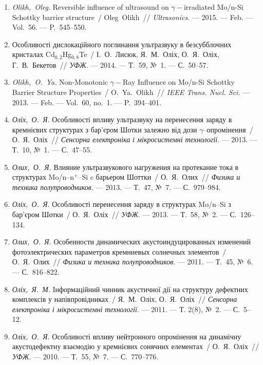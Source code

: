 \begin{enumerate}[label=\arabic*.,leftmargin=1em,itemindent=1em]
\item
\emph{Olikh,~Oleg}. Reversible influence of ultrasound on
  $\gamma-$irradiated {M}o/n-{S}i {S}chottky barrier structure~/ Oleg~Olikh~//
  \emph{Ultrasonics}. ---
  2015. --- Feb. ---
  Vol.~56. ---
  P.~545--550.

\item
Особливості дислокаційного поглинання
  ультразвуку в безсубблочних кристалах
  {C}d$_{0,2}${H}g$_{0,8}${T}e~/ І.~О.~Лисюк, Я.~М.~Оліх,
  О.~Я.~Оліх, Г.~В.~Бекетов~// \emph{УФЖ}. ---
  2014. ---
  Т.~59, {№}~1. ---
  {С.}~50--57.

\item
\emph{Olikh,~O.~Ya.} Non-Monotonic $\gamma-$Ray Influence on {M}o/n-{S}i
  {S}chottky Barrier Structure Properties~/ O.~Ya.~Olikh~// \emph{IEEE
  Trans. Nucl. Sci.} ---
  2013. --- Feb. ---
  Vol.~60, no.~1. ---
  P.~394--401.

\item
\emph{Оліх,~О.~Я.} Особливості впливу
  ультразвуку на перенесення заряду в
  кремнієвих структурах з бар’єром {Ш}отки
  залежно від дози $\gamma$--опромінення~/
  О.~Я.~Оліх~// \emph{Сенсорна електроніка і
  мікросистемні технології}. ---
  2013. ---
  Т.~10, {№}~1. ---
  {С.}~47--55.

\item
\emph{Олих,~О.~Я.} Влияние ультразвукового
  нагружения на протекание тока в
  структурах {M}o/n--n$^+$--{S}i c барьером {Ш}оттки~/
  О.~Я.~Олих~// \emph{Физика и техника
  полупроводников}. ---
  2013. ---
  Т.~47, {№}~7. ---
  {С.}~979--984.

\item
\emph{Оліх,~О.~Я.} Особливості перенесення
  заряду в структурах {M}o/n--{S}i з бар’єром
  {Ш}отки~/ О.~Я.~Оліх~// \emph{УФЖ}. ---
  2013. ---
  Т.~58, {№}~2. ---
  {С.}~126--134.

\item
\emph{Олих,~О.~Я.} Особенности динамических
  акустоиндуцированных изменений
  фотоэлектрических параметров кремниевых
  солнечных элементов~/ О.~Я.~Олих~//
  \emph{Физика и техника полупроводников}. ---
  2011. ---
  Т.~45, {№}~6. ---
  {С.}~816--822.

\item
\emph{Оліх,~Я.~М.} Інформаційний чинник
  акустичної дії на структуру дефектних
  комплексів у напівпровідниках~/ Я.~М.~Оліх,
  О.~Я.~Оліх~// \emph{Сенсорна електроніка і
  мікросистемні технології}. ---
  2011. ---
  Т. 2(8), {№}~2. ---
  {С.}~5--12.

\item
\emph{Оліх,~О.~Я.} Особливості впливу
  нейтронного опромінення на динамічну
  акустодефектну взаємодію у кремнієвих
  сонячних елементах~/ О.~Я.~Оліх~// \emph{УФЖ}.
  ---
  2010. ---
  Т.~55, {№}~7. ---
  {С.}~770--776.



\end{enumerate}
